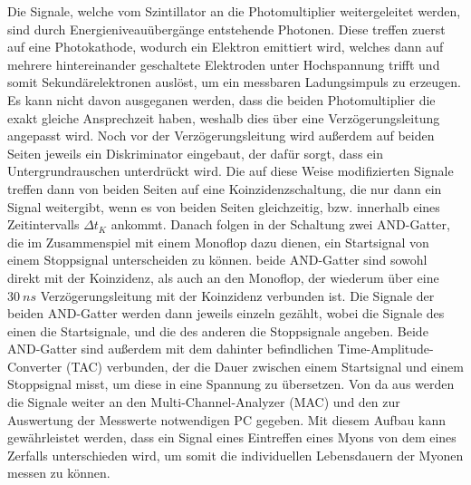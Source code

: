 Die Signale, welche vom Szintillator an die Photomultiplier weitergeleitet werden, sind durch Energieniveauübergänge entstehende Photonen. Diese treffen zuerst auf eine Photokathode,
wodurch ein Elektron emittiert wird, welches dann auf mehrere hintereinander geschaltete Elektroden unter Hochspannung trifft und somit Sekundärelektronen auslöst, um ein messbaren
Ladungsimpuls zu erzeugen. Es kann nicht davon ausgeganen werden, dass die beiden Photomultiplier die exakt gleiche Ansprechzeit haben, weshalb dies über eine Verzögerungsleitung 
angepasst wird. Noch vor der Verzögerungsleitung wird außerdem auf beiden Seiten jeweils ein Diskriminator eingebaut, der dafür sorgt, dass ein Untergrundrauschen unterdrückt wird.
Die auf diese Weise modifizierten Signale treffen dann von beiden Seiten auf eine Koinzidenzschaltung, die nur dann ein Signal weitergibt, wenn es von beiden Seiten gleichzeitig,
bzw. innerhalb eines Zeitintervalls $\Delta t_K $ ankommt. 
Danach folgen in der Schaltung zwei AND-Gatter, die im Zusammenspiel mit einem Monoflop dazu dienen, ein Startsignal von einem Stoppsignal unterscheiden zu können. beide AND-Gatter
sind sowohl direkt mit der Koinzidenz, als auch an den Monoflop, der wiederum über eine $\SI{30}{ns}$ Verzögerungsleitung mit der Koinzidenz verbunden ist. Die Signale der beiden 
AND-Gatter werden dann jeweils einzeln gezählt, wobei die Signale des einen die Startsignale, und die des anderen die Stoppsignale angeben. Beide AND-Gatter sind außerdem mit 
dem dahinter befindlichen Time-Amplitude-Converter (TAC) verbunden, der die Dauer zwischen einem Startsignal und einem Stoppsignal misst, um diese in eine Spannung zu 
übersetzen. Von da aus werden die Signale weiter an den Multi-Channel-Analyzer (MAC) und den zur Auswertung der Messwerte notwendigen PC gegeben. Mit diesem Aufbau kann 
gewährleistet werden, dass ein Signal eines Eintreffen eines Myons von dem eines Zerfalls unterschieden wird, um somit die individuellen Lebensdauern der Myonen messen zu können. 